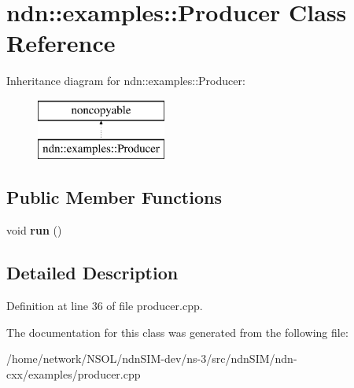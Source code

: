 \hypertarget{classndn_1_1examples_1_1Producer}{}\section{ndn\+:\+:examples\+:\+:Producer Class Reference}
\label{classndn_1_1examples_1_1Producer}
Inheritance diagram for ndn\+:\+:examples\+:\+:Producer\+:\begin{figure}[H]
\begin{center}
\leavevmode
\includegraphics[height=2.000000cm]{classndn_1_1examples_1_1Producer}
\end{center}
\end{figure}
\subsection*{Public Member Functions}
\begin{DoxyCompactItemize}
\item 
void {\bfseries run} ()\hypertarget{classndn_1_1examples_1_1Producer_a574de18511824f33252002c6d5395ac2}{}\label{classndn_1_1examples_1_1Producer_a574de18511824f33252002c6d5395ac2}

\end{DoxyCompactItemize}


\subsection{Detailed Description}


Definition at line 36 of file producer.\+cpp.



The documentation for this class was generated from the following file\+:\begin{DoxyCompactItemize}
\item 
/home/network/\+N\+S\+O\+L/ndn\+S\+I\+M-\/dev/ns-\/3/src/ndn\+S\+I\+M/ndn-\/cxx/examples/producer.\+cpp\end{DoxyCompactItemize}
